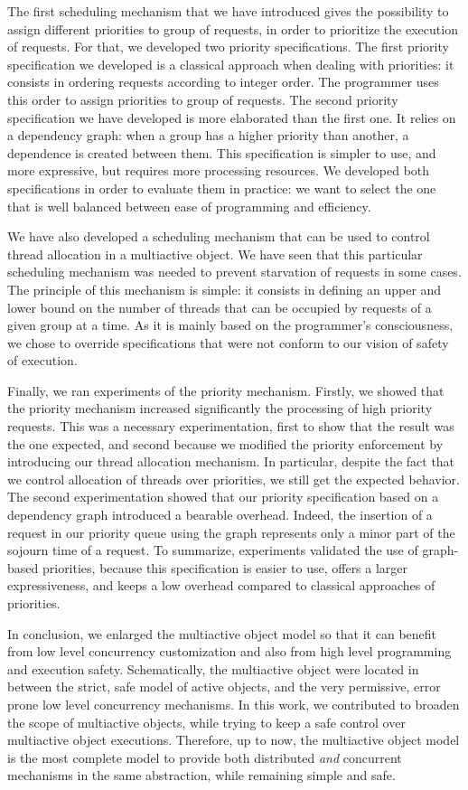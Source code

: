 \documentclass[11pt]{report}
\begin{document}
The first scheduling mechanism that we have introduced gives the possibility to assign different priorities to group of requests, in order to prioritize the execution of requests. For that, we developed two priority specifications. The first priority specification we developed is a classical approach when dealing with priorities: it consists in ordering requests according to integer order. The programmer uses this order to assign priorities to group of requests. The second priority specification we have developed is more elaborated than the first one. It relies on a dependency graph: when a group has a higher priority than another, a dependence is created between them. This specification is simpler to use, and more expressive, but requires more processing resources. We developed both specifications in order to evaluate them in practice: we want to select the one that is well balanced between ease of programming and efficiency.

We have also developed a scheduling mechanism that can be used to control thread allocation in a multiactive object. We have seen that this particular scheduling mechanism was needed to prevent starvation of requests in some cases. The principle of this mechanism is simple: it consists in defining an upper and lower bound on the number of threads that can be occupied by requests of a given group at a time. As it is mainly based on the programmer's consciousness, we chose to override specifications that were not conform to our vision of safety of execution.

Finally, we ran experiments of the priority mechanism. Firstly, we showed that the priority mechanism increased significantly the processing of high priority requests. This was a necessary experimentation, first to show that the result was the one expected, and second because we modified the priority enforcement by introducing our thread allocation mechanism. In particular, despite the fact that we control allocation of threads over priorities, we still get the expected behavior. The second experimentation showed that our priority specification based on a dependency graph introduced a bearable overhead. Indeed, the insertion of a request in our priority queue using the graph represents only a minor part of the sojourn time of a request. To summarize, experiments validated the use of graph-based priorities, because this specification is easier to use, offers a larger expressiveness, and keeps a low overhead compared to classical approaches of priorities. 


In conclusion, we enlarged the multiactive object model so that it can benefit from low level concurrency customization and also from high level programming and execution safety. Schematically, the multiactive object were located in between the strict, safe model of active objects, and the very permissive, error prone low level concurrency mechanisms. In this work, we contributed to broaden the scope of multiactive objects, while trying to keep a safe control over multiactive object executions. Therefore, up to now, the multiactive object model is the most complete model to provide both distributed \emph{and} concurrent mechanisms in the same abstraction, while remaining simple and safe.
\end{document}
